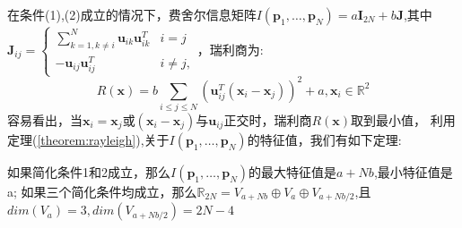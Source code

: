 在条件(1),(2)成立的情况下，费舍尔信息矩阵$I(\bm{p}_1,\dots,\bm{p}_N)=a\bm{I}_{2N}+b\bm{J}$,其中$\bm{J}_{ij}=\begin{cases}
\sum_{k=1,k\neq i}^N \bm{u}_{ik}\bm{u}_{ik}^T&i=j\\
-\bm{u}_{ij}\bm{u}_{ij}^T&i\neq j,
\end{cases}$，瑞利商为:
\begin{equation}
R(\bm{x})=b\sum_{i\leq j\leq N} (\bm{u}_{ij}^T(\bm{x}_i-\bm{x}_j))^2+a,\bm{x}_i\in \mathbb{R}^2
\end{equation}
容易看出，当$\bm{x}_i=\bm{x}_j$或$(\bm{x}_i-\bm{x}_j)$与$\bm{u}_{ij}$正交时，瑞利商$R(\bm{x})$取到最小值，
利用定理(\ref{theorem:rayleigh}),关于$I(\bm{p}_1,\dots,\bm{p}_N)$的特征值，我们有如下定理:
\begin{theorem}
如果简化条件1和2成立，那么$I(\bm{p}_1,\dots,\bm{p}_N)$的最大特征值是$a+Nb$,最小特征值是a;
如果三个简化条件均成立，那么$\mathbb{R}_{2N}=V_{a+Nb}\oplus V_a\oplus V_{a+Nb/2}$,且$dim(V_a)=3,dim(V_{a+Nb/2})=2N-4$
\end{theorem}
